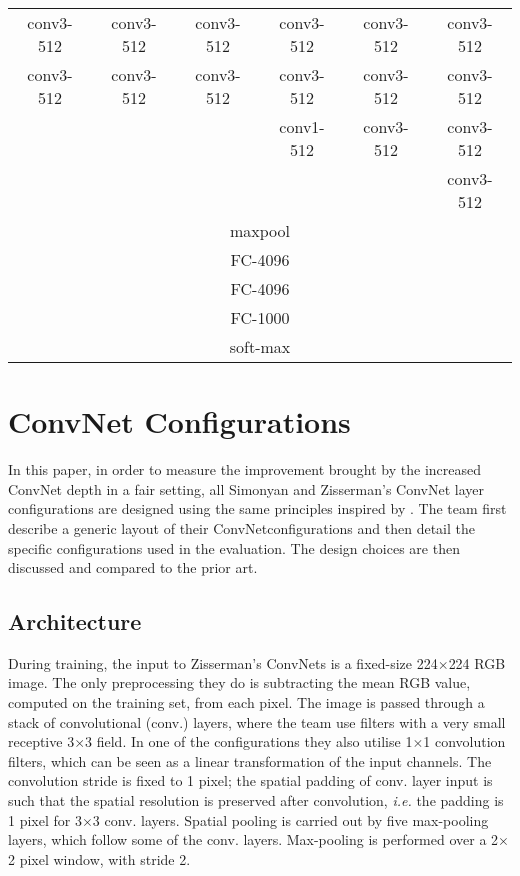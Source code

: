 \documentclass[10pt,twocolumn,letterpaper]{article}
\begin{document}
\begin{table*}[!b]
\begin{center}
{\begin{tabular}{|c|c|c|c|c|c|}
				\hline
				conv3-512&conv3-512&conv3-512&conv3-512&conv3-512&conv3-512\\
				conv3-512&conv3-512&conv3-512&conv3-512&conv3-512&conv3-512\\
				&&&conv1-512&conv3-512&conv3-512\\
				&&&&&conv3-512\\
				\hline
				\multicolumn{6}{|c|}{maxpool}  \\
				\hline
				\multicolumn{6}{|c|}{FC-4096}  \\
				\hline
				\multicolumn{6}{|c|}{FC-4096}  \\
				\hline
				\multicolumn{6}{|c|}{FC-1000}  \\
				\hline
				\multicolumn{6}{|c|}{soft-max}  \\
				\hline
			\end{tabular} }
		\end{center}
	\end{table*}

\section{ConvNet Configurations}

In this paper, in order to measure the improvement brought by the increased ConvNet depth in a fair setting, all Simonyan and Zisserman's ConvNet layer configurations are designed using the same principles inspired by \cite{Krizhevsky2012ImageNet}. The team first describe a generic layout of their ConvNetconfigurations and then detail the specific configurations used in the evaluation. The design choices are then discussed and compared to the prior art.

\subsection{Architecture}

During training, the input to Zisserman's ConvNets is a fixed-size 224$\times$224 RGB image. The only preprocessing they do is subtracting the mean RGB value, computed on the training set, from each pixel. The image is passed through a stack of convolutional (conv.) layers, where the team use filters with a very small receptive 3$\times$3 field. In one of the configurations they also utilise 1$\times$1 convolution filters, which can be seen as a linear transformation of the input channels. The convolution stride is fixed to 1 pixel; the spatial padding of conv. layer input is such that the spatial resolution is preserved after convolution, \emph{i.e.} the padding is 1 pixel for 3$\times$3 conv. layers. Spatial pooling is carried out by five max-pooling layers, which follow some of the conv. layers. Max-pooling is performed over a 2$\times$2 pixel window, with stride 2. 
\end{document}
